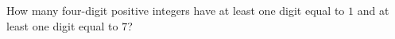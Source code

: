 How many four-digit positive integers have at least one digit equal to $1$ and at least one digit equal to $7$?
